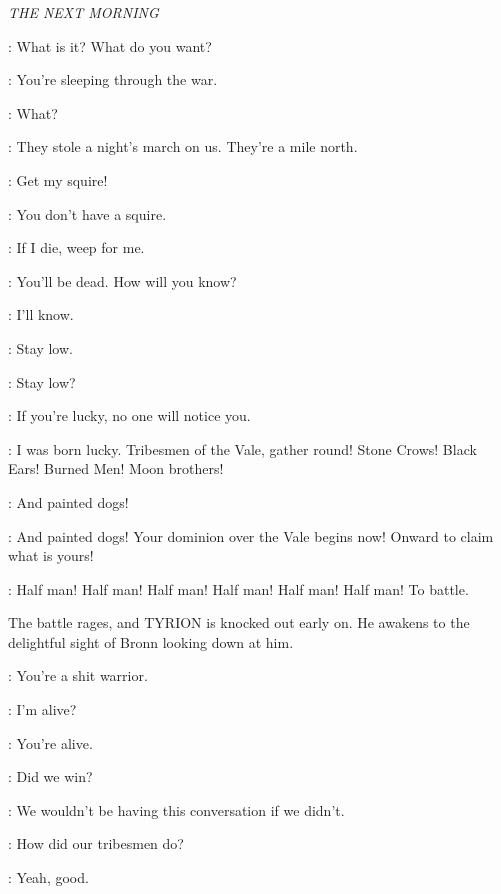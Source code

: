 \scene

\textit{THE NEXT MORNING} 


\TYRION: What is it? What do you want? 

\BRONN: You're sleeping through the war. 

\TYRION: What? 

\BRONN: They stole a night's march on us. They're a mile north. 

\TYRION: Get my squire! 

\BRONN: You don't have a squire. 

\TYRION: If I die, weep for me. 

\SHAE: You'll be dead. How will you know? 

\TYRION: I'll know. 


\BRONN: Stay low. 

\TYRION: Stay low? 

\BRONN: If you're lucky, no one will notice you. 

\TYRION: I was born lucky. Tribesmen of the Vale, gather round! Stone Crows! Black Ears! Burned Men! Moon brothers! 

\HILLTRIBESMAN: And painted dogs! 

\TYRION: And painted dogs! Your dominion over the Vale begins now! Onward to claim what is yours! 

\CROWD: Half man! Half man! Half man! Half man! Half man! Half man! To battle. 


\n The battle rages, and TYRION is knocked out early on.  He awakens to the delightful sight of Bronn looking down at him.

\BRONN: You're a shit warrior. 

\TYRION: I'm alive? 

\BRONN: You're alive. 

\TYRION: Did we win? 

\BRONN: We wouldn't be having this conversation if we didn't. 

\TYRION: How did our tribesmen do? 

\BRONN: Yeah, good. 


